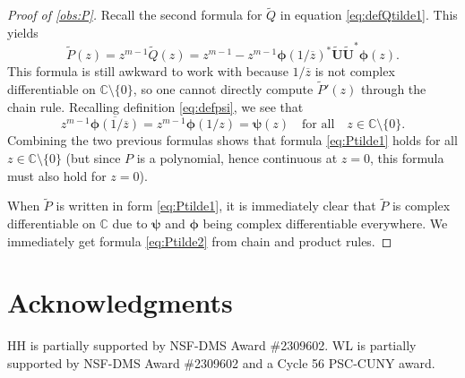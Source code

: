 \documentclass[11pt]{article}
\theoremstyle{definition}
\numberwithin{theorem}{section}
\numberwithin{equation}{section}
\def\C{\mathbb{C}}
\renewcommand{\tilde}{\widetilde}
\newcommand{\bfU}{{\boldsymbol U}}
\newcommand{\bfphi}{{\boldsymbol \phi}}
\newcommand{\bfpsi}{{\boldsymbol \psi}}
\def\forallspace{\quad\text{for all}\quad}
\numberwithin{equation}{section}
\begin{document}
\begin{proof}[Proof of \cref{obs:P}]
    Recall the second formula for $\tilde Q$ in equation \eqref{eq:defQtilde1}. This yields 
    $$
    \tilde P(z)
    = z^{m-1} \tilde Q(z)
    = z^{m-1} - z^{m-1} \bfphi(1/\overline z)^* \tilde \bfU \tilde \bfU^* \bfphi(z).
    $$
    This formula is still awkward to work with because $1/\overline z$ is not complex differentiable on $\C \setminus \{0\}$, so one cannot directly compute $\tilde P'(z)$ through the chain rule. Recalling definition \eqref{eq:defpsi}, we see that
    $$
    z^{m-1} \overline{\bfphi(1/\overline z)}=z^{m-1}\bfphi(1/z)=\bfpsi(z) \forallspace z\in \C\setminus \{0\}.
    $$
    Combining the two previous formulas shows that formula \eqref{eq:Ptilde1} holds for all $z\in \C\setminus \{0\}$ (but since $P$ is a polynomial, hence continuous at $z=0$, this formula must also hold for $z=0$).
    
    When $\tilde P$ is written in form \eqref{eq:Ptilde1}, it is immediately clear that $\tilde P$ is complex differentiable on $\C$ due to $\bfpsi$ and $\bfphi$ being complex differentiable everywhere. We immediately get formula \eqref{eq:Ptilde2} from chain and product rules. 
\end{proof}

\section*{Acknowledgments} 
HH is partially supported by NSF-DMS Award \#2309602. WL is partially supported by NSF-DMS Award \#2309602 and a Cycle 56 PSC-CUNY award. 


	





\end{document}
